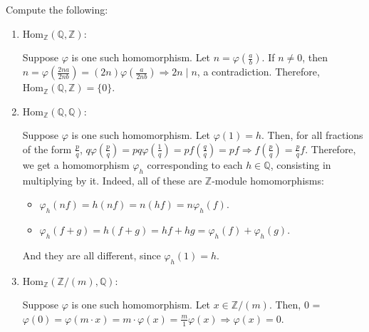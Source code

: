 \begin{problem}
    Compute the following:

    \begin{enumerate}[label=(\theproblem.\arabic*),ref=\theproblem.\arabic*]
        \item $\text{Hom}_{\mathbb{Z}}(\mathbb{Q}, \mathbb{Z})$:
        \begin{sol}
            Suppose $\varphi$ is one such homomorphism.
            Let $n = \varphi\left(\frac{a}{b}\right)$.
            If $n \neq 0$, then $n = \varphi\left(\frac{2na}{2nb}\right) = (2n)\varphi\left(\frac{a}{2nb}\right) \Rightarrow 2n \mid n$, a contradiction.
            Therefore, $\text{Hom}_{\mathbb{Z}}(\mathbb{Q}, \mathbb{Z}) = \{0\}$.
        \end{sol}

        \item $\text{Hom}_{\mathbb{Z}}(\mathbb{Q}, \mathbb{Q})$:
            \begin{sol}
                Suppose $\varphi$ is one such homomorphism.
                Let $\varphi(1) = h$.
                Then, for all fractions of the form $\frac{p}{q}$,
                $q\varphi\left(\frac{p}{q}\right) = pq \varphi\left(\frac{1}{q}\right) = p f\left(\frac{q}{q}\right) = pf \Rightarrow
                f\left(\frac{p}{q}\right) = \frac{p}{q}f$.
                Therefore, we get a homomorphism $\varphi_h$ corresponding to each $h\in \mathbb{Q}$, consisting in multiplying by it.
                Indeed, all of these are $\mathbb{Z}$-module homomorphisms:
                \begin{itemize}
                    \item $\varphi_h(nf) = h(nf) = n(hf) = n\varphi_h(f)$.
                    \item $\varphi_h(f+g) = h(f+g) = hf + hg = \varphi_h(f) + \varphi_h(g)$.
                \end{itemize}
                And they are all different, since $\varphi_h(1) = h$.
            \end{sol}
        \item $\text{Hom}_{\mathbb{Z}}(\mathbb{Z}/(m), \mathbb{Q})$:
            \begin{sol}
                Suppose $\varphi$ is one such homomorphism.
                Let $x \in \mathbb{Z}/(m)$.
                Then, 0 = $\varphi(0) = \varphi(m \cdot x) = m\cdot \varphi(x) = \frac{m}{1}\varphi(x) \Rightarrow \varphi(x) = 0$.

            \end{sol}
    \end{enumerate}
\end{problem}